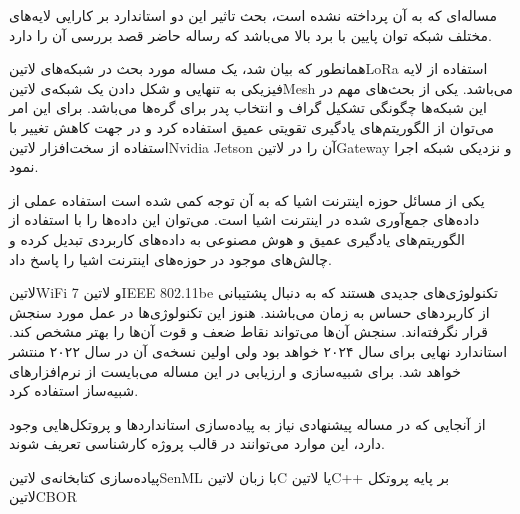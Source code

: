 مساله‌ای که به آن پرداخته نشده است، بحث تاثیر این دو استاندارد بر کارایی لایه‌های مختلف شبکه توان پایین با برد بالا می‌باشد که رساله حاضر قصد بررسی آن را دارد.


همانطور که بیان شد، یک مساله مورد بحث در شبکه‌های ‌لاتین{LoRa} استفاده از لایه فیزیکی به تنهایی و شکل دادن یک شبکه‌ی ‌لاتین{Mesh} می‌باشد.
یکی از بحث‌های مهم در این شبکه‌ها چگونگی تشکیل گراف و انتخاب پدر برای گره‌ها می‌باشد. برای این امر می‌توان از الگوریتم‌های یادگیری تقویتی عمیق استفاده کرد
و در جهت کاهش تغییر با استفاده از سخت‌افزار ‌لاتین{Nvidia Jetson} آن را در ‌لاتین{Gateway} و نزدیکی شبکه اجرا نمود.


یکی از مسائل حوزه اینترنت اشیا که به آن توجه کمی شده است استفاده عملی از داده‌های جمع‌آوری شده در اینترنت اشیا است. می‌توان این داده‌ها را با استفاده از الگوریتم‌های یادگیری عمیق و هوش مصنوعی به داده‌های کاربردی تبدیل کرده
و چالش‌های موجود در حوزه‌های اینترنت اشیا را پاسخ داد.


‌لاتین{WiFi 7} و ‌لاتین{IEEE 802.11be} تکنولوژی‌های جدیدی هستند که به دنبال پشتیبانی از کاربردهای حساس به زمان می‌باشند. هنوز این تکنولوژی‌ها در عمل مورد سنجش قرار نگرفته‌اند.
سنجش آن‌ها می‌تواند نقاط ضعف و قوت آن‌ها را بهتر مشخص کند. استاندارد نهایی برای سال ۲۰۲۴ خواهد بود ولی اولین نسخه‌ی آن در سال ۲۰۲۲ منتشر خواهد شد. برای شبیه‌سازی و ارزیابی در این
مساله می‌بایست از نرم‌افزارهای شبیه‌ساز استفاده کرد.


از آنجایی که در مساله پیشنهادی نیاز به پیاده‌سازی استانداردها و پروتکل‌هایی وجود دارد، این موارد می‌توانند در قالب پروژه کارشناسی تعریف شوند.

 پیاده‌سازی کتابخانه‌ی ‌لاتین{SenML} با زبان ‌لاتین{C} یا ‌لاتین{C++} بر پایه پروتکل ‌لاتین{CBOR}

